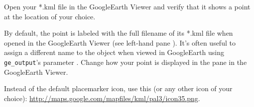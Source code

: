 \begin{action}
Open your *.kml file in the GoogleEarth Viewer and verify that it shows a point at the location of your choice.
\end{action}

\begin{action}
By default, the point is labeled with the full filename of its *.kml file when opened in the GoogleEarth Viewer (see left-hand pane ). It's often useful to assign a different name to the object when viewed in GoogleEarth using {\tt ge\_output}'s parameter {\tt {}}. Change how your point is displayed in the  pane in the GoogleEarth Viewer.
\end{action}

\begin{action}
Instead of the default placemarker icon, use this {\tt {}} (or any other icon of your choice): \url{http://maps.google.com/mapfiles/kml/pal3/icon35.png}.
\end{action}


